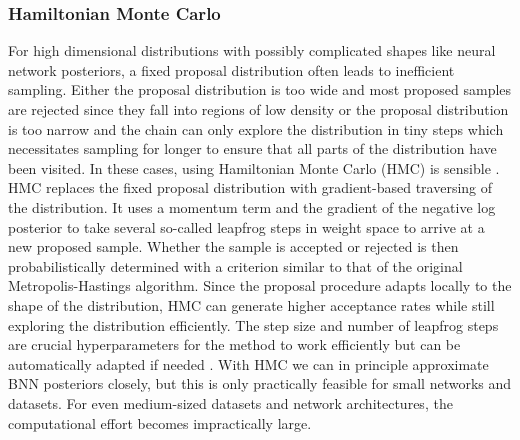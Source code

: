 \documentclass[../thesis.tex]{subfiles}
\begin{document}
\subsubsection*{Hamiltonian Monte Carlo}
For high dimensional distributions with possibly complicated shapes like neural network posteriors, a fixed proposal distribution often leads to inefficient sampling. Either the proposal distribution is too wide and most proposed samples are rejected since they fall into regions of low density or the proposal distribution is too narrow and the chain can only explore the distribution in tiny steps which necessitates sampling for longer to ensure that all parts of the distribution have been visited. In these cases, using Hamiltonian Monte Carlo (HMC) is sensible \parencite{duane1987hybrid, neal1995bayesian}. HMC replaces the fixed proposal distribution with gradient-based traversing of the distribution. It uses a momentum term and the gradient of the negative log posterior to take several so-called leapfrog steps in weight space to arrive at a new proposed sample. Whether the sample is accepted or rejected is then probabilistically determined with a criterion similar to that of the original Metropolis-Hastings algorithm. Since the proposal procedure adapts locally to the shape of the distribution, HMC can generate higher acceptance rates while still exploring the distribution efficiently. The step size and number of leapfrog steps are crucial hyperparameters for the method to work efficiently but can be automatically adapted if needed \parencite{hoffman2014no}.  With HMC we can in principle approximate BNN posteriors closely, but this is only practically feasible for small networks and datasets. For even medium-sized datasets and network architectures, the computational effort becomes impractically large.
\end{document}
